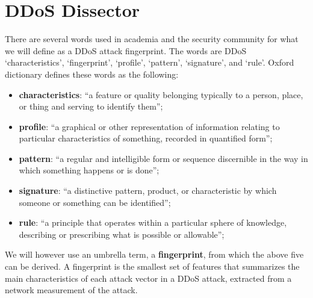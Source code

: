 \section{DDoS Dissector}
\label{sec:ddos_dissector}

There are several words used in academia and the security community for what we will define as a DDoS attack fingerprint. The words are DDoS `characteristics', `fingerprint', `profile', `pattern', `signature', and `rule'. Oxford dictionary defines these words as the following:

\begin{itemize}
	\item \textbf{characteristics}: ``a feature or quality belonging typically to a person, place, or thing and serving to identify them'';
	\item \textbf{profile}: ``a graphical or other representation of information relating to particular characteristics of something, recorded in quantified form'';
	\item \textbf{pattern}: ``a regular and intelligible form or sequence discernible in the way in which something happens or is done'';
	\item \textbf{signature}: ``a distinctive pattern, product, or characteristic by which someone or something can be identified'';
	\item \textbf{rule}: ``a principle that operates within a particular sphere of knowledge, describing or prescribing what is possible or allowable'';
\end{itemize}

We will however use an umbrella term, a \textbf{fingerprint}, from which the above five can be derived. A fingerprint is the smallest set of features that summarizes the main characteristics of each attack vector in a DDoS attack, extracted from a network measurement of the attack.

